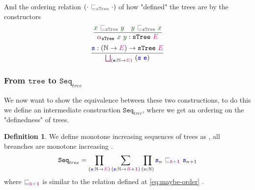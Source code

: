 \documentclass[twoside,11pt,openright]{report}
\theoremstyle{plain} %
\theoremstyle{definition}
\newtheorem{defn}[thm]{Definition}%
\theoremstyle{remark}
\newcommand*{\term}[1]{\textcolor{green!30!black}{#1}} %
\newcommand*{\type}[1]{\textcolor{magenta!90!black}{#1}}
\newcommand*{\unit}{\type{\textbf{1}}}
\newcommand*{\relation}[1]{\textcolor{gray!75!black}{\ensuremath{\mathtt{#1}}}}
\newcommand*{\function}[1]{\textcolor{blue!60!black}{\ensuremath{\mathtt{#1}}}}
\newcommand*{\constructor}[1]{\textcolor{purple!60!black}{\ensuremath{\mathtt{#1}}}}
\newcommand*{\typeformer}[1]{\ensuremath{\mathtt{#1}}}
\begin{document}
And the ordering relation \((\cdot~\relation{\sqsubseteq_{sTree}}~\cdot)\) of how "defined" the trees are by the constructors 
\begin{equation}
  \vcenter{\infer{\constructor{\alpha}_{\typeformer{sTree}}~\term{x}~\term{y} : \typeformer{sTree}~\type{E}}{\term{x}~\relation{\sqsubseteq_{sTree}}~\term{y} & \term{y}~\relation{\sqsubseteq_{sTree}}~\term{x}}}
\end{equation}
\begin{equation}
  \vcenter{\infer{\mathop{\constructor{\bigsqcup}}_{(\function{e} : \mathbb{N} \rightarrow \type{E})}~(\function{s}~\function{e})}{\function{s} : (\mathbb{N} \rightarrow \type{E}) \rightarrow \typeformer{sTree}~\type{E}}}
\end{equation}

\subsubsection{From \(\typeformer{tree}\) to \(\typeformer{Seq}_{tree}\)}
We now want to show the equivalence between these two constructions, to do this we define an intermediate construction \(\typeformer{Seq}_{tree}\), where we get an ordering on the "definedness" of trees.
\begin{defn}
  We define monotone increasing sequences of trees as , all breanches are monotone increasing .
  \begin{equation}
    \typeformer{Seq}_{tree} = \prod_{(\function{e} : \mathbb{N} \rightarrow \type{E})} \sum_{(\function{s} : \mathbb{N} \rightarrow \type{R} + \unit)} \prod_{(n : \mathbb{N})} \function{s}_n~\relation{\sqsubseteq_{\type{R}+\unit}}~\function{s}_{n+1}
  \end{equation}
  where \(\relation{\sqsubseteq_{\type{R}+\unit}}\) is similar to the relation defined at \eqref{eq:maybe-order} .
\end{defn}
\end{document}
